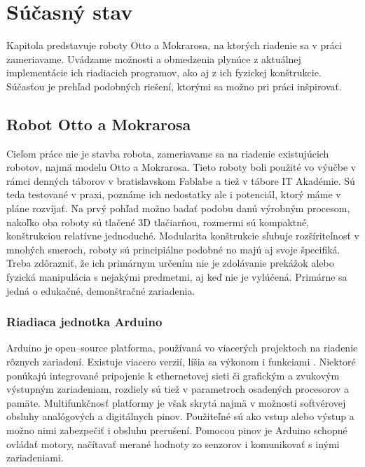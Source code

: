 \chapter{Súčasný stav}

\label{kap:vychodisko}

Kapitola predstavuje roboty Otto a Mokrarosa, na ktorých riadenie sa v práci zameriavame. Uvádzame možnosti a obmedzenia plynúce z aktuálnej implementácie ich riadiacich programov, ako aj z ich fyzickej konštrukcie. Súčasťou je prehľad podobných riešení, ktorými sa možno pri práci inšpirovať.

\section{Robot Otto a Mokrarosa}
\label{sec:OttoMokrarosa}
Cieľom práce nie je stavba robota, zameriavame sa na riadenie existujúcich robotov, najmä modelu Otto a Mokrarosa. Tieto roboty boli použité vo výučbe v rámci denných táborov v bratislavskom Fablabe a tiež v tábore IT Akadémie. Sú teda testované v praxi, poznáme ich nedostatky ale i potenciál, ktorý máme v pláne rozvíjať. Na prvý pohľad možno badať podobu danú výrobným procesom, nakoľko oba roboty sú tlačené 3D tlačiarňou, rozmermi sú kompaktné, konštrukciou relatívne jednoduché. Modularita konštrukcie sľubuje rozšíriteľnosť v mnohých smeroch, roboty sú principiálne podobné no majú aj svoje špecifiká. Treba zdôrazniť, že ich primárnym určením nie je zdolávanie prekážok alebo fyzická manipulácia s nejakými predmetmi, aj keď nie je vylúčená. Primárne sa jedná o edukačné, demonštračné zariadenia.

\subsection{Riadiaca jednotka Arduino}
\label{sub:arduino}
Arduino je open--source platforma, používaná vo viacerých projektoch na riadenie rôznych zariadení. Existuje viacero verzií, líšia sa výkonom i funkciami \cite{ArduinoConcept}. Niektoré ponúkajú integrované pripojenie k ethernetovej sieti či grafickým a zvukovým výstupným zariadeniam, rozdiely sú tiež v parametroch osadených procesorov a pamäte. Multifunkčnosť platformy je však skrytá najmä v možnosti softvérovej obsluhy analógových a digitálnych pinov. Použiteľné sú ako vstup alebo výstup a možno nimi zabezpečiť i obsluhu prerušení. Pomocou pinov je Arduino schopné ovládať motory, načítavať merané hodnoty zo senzorov i komunikovať s inými zariadeniami.

